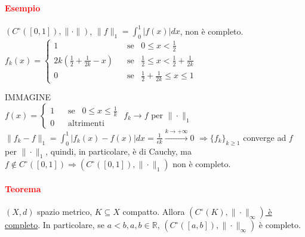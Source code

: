 \documentclass{article}
\newcommand{\R}{\mathbb{R}}
\begin{document}
\paragraph{\textcolor{red}{Esempio}}
$(C^\circ([0,1]), \|\cdot \|)$, $\| f \|_1 = \int_{0}^{1} |f(x)|dx$, non è completo.\\
$f_k(x)= \begin{cases}
    1&\,\,\,\,\,\text{se}\,\,\,\,\, 0 \leq x < \frac{1}{2} \\
    2k\left(\frac{1}{2}+\frac{1}{2k}-x\right)& \,\,\,\,\,\text{se}\,\,\,\,\, \frac{1}{2} \leq x <  \frac{1}{2}+ \frac{1}{2k}\\
   0 & \,\,\,\,\,\text{se}\,\,\,\,\, \frac{1}{2}+ \frac{1}{2k} \leq x \leq 1
\end{cases}$

IMMAGINE\\

$f(x)= \begin{cases}
    1&\,\,\,\,\,\text{se}\,\,\,\,\, 0 \leq x \leq \frac{1}{k}\\
    0&\,\,\,\,\,\text{altrimenti}\,\,\,\,\,
\end{cases}$
$f_k \rightarrow f$ per $\|\cdot\|_1$\\
$\|f_k-f\|_1=\int_{0}^{1}|f_k(x)-f(x)|dx=\frac{1}{\epsilon k} \xrightarrow{k \rightarrow +\infty} 0$
$\Rightarrow \{f_k\}_{k \geq 1}$ converge ad $f$ per $\|\cdot \|_1$, quindi, in particolare, è di Cauchy, ma $ f \notin C^\circ([0,1]) \Rightarrow (C^\circ([0,1]),\|\cdot\|_1)$ non è completo.

\paragraph{\textcolor{red}{Teorema}}
$(X,d)$ spazio metrico, $K \subseteq X$ compatto. Allora \underline{$(C^\circ(K), \|\cdot\|_\infty)$ è completo}. In particolare, se $a < b, a, b \in \R$, $(C^\circ([a,b]),\|\cdot\|_\infty)$ è completo.
\end{document}
